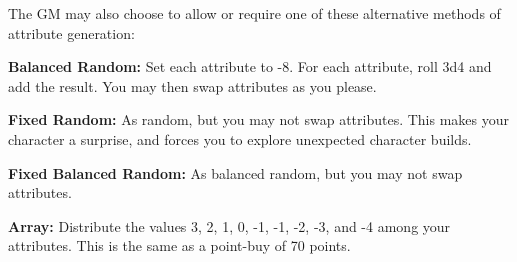 \begin{multicols*}{2}
    The GM may also choose to allow or require  one of these alternative
    methods of attribute generation:
    
    \textbf{Balanced Random:} Set each attribute to -8. For each attribute,
    roll 3d4 and add the result. You may then swap attributes as you please.

    \textbf{Fixed Random:} As random, but you may not swap attributes. This
    makes your character a surprise, and forces you to explore unexpected
    character builds.

    \textbf{Fixed Balanced Random:} As balanced random, but you may not swap
    attributes.

    \textbf{Array:} Distribute the values 3, 2, 1, 0, -1, -1, -2, -3, and -4
    among your attributes. This is the same as a point-buy of 70 points.

\end{multicols*}




